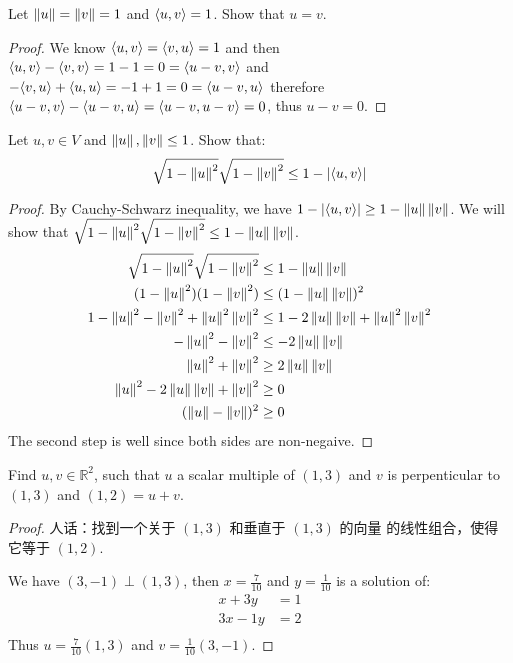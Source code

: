 \documentclass[../main.tex]{subfiles}
\begin{document}
\setcounter{exercise}{8}
\begin{exercise}
  Let $\left\Vert u \right\Vert = \left\Vert v \right\Vert = 1$ and $\langle u , v\rangle = 1$. Show that $u = v$.
\end{exercise}
\begin{proof}
  We know $\langle u , v\rangle = \langle v , u\rangle = 1$ and then
  $\langle u , v\rangle - \langle v , v\rangle = 1 - 1 = 0 = \langle u - v , v\rangle$ and
  $- \langle v , u\rangle + \langle u , u\rangle = - 1 + 1 = 0 = \langle u - v , u\rangle$ therefore 
  $\langle u - v , v\rangle - \langle u - v , u\rangle = \langle u - v , u - v\rangle = 0$,
  thus $u - v = 0$.
\end{proof}

\begin{exercise}
  Let $u, v \in V$ and $\left\Vert u \right\Vert, \left\Vert v \right\Vert \le 1$. Show that:
  \[
  \sqrt{1 - \left\Vert u \right\Vert^2}\sqrt{1 - \left\Vert v \right\Vert^2} \le 1 - |\langle u , v\rangle|
  \]
\end{exercise}
\begin{proof}
  By Cauchy-Schwarz inequality, we have $1 - |\langle u , v\rangle| \ge 1 - \left\Vert u \right\Vert\left\Vert v \right\Vert$.
  We will show that $\sqrt{1 - \left\Vert u \right\Vert^2}\sqrt{1 - \left\Vert v \right\Vert^2} \le 1 - \left\Vert u \right\Vert\left\Vert v \right\Vert$.
  \begin{align*}
    \sqrt{1 - \left\Vert u \right\Vert^2}\sqrt{1 - \left\Vert v \right\Vert^2} & \le 1 - \left\Vert u \right\Vert\left\Vert v \right\Vert \\
    (1 - \left\Vert u \right\Vert^2)(1 - \left\Vert v \right\Vert^2) & \le (1 - \left\Vert u \right\Vert\left\Vert v \right\Vert)^2 \\
    1 - \left\Vert u \right\Vert^2 - \left\Vert v \right\Vert^2 + \left\Vert u \right\Vert^2\left\Vert v \right\Vert^2 & \le 1 - 2\left\Vert u \right\Vert\left\Vert v \right\Vert + \left\Vert u \right\Vert^2\left\Vert v \right\Vert^2 \\
    - \left\Vert u \right\Vert^2 - \left\Vert v \right\Vert^2 & \le - 2\left\Vert u \right\Vert\left\Vert v \right\Vert \\
    \left\Vert u \right\Vert^2 + \left\Vert v \right\Vert^2 & \ge 2\left\Vert u \right\Vert\left\Vert v \right\Vert \\
    \left\Vert u \right\Vert^2 - 2\left\Vert u \right\Vert\left\Vert v \right\Vert + \left\Vert v \right\Vert^2 & \ge 0 \\
    (\left\Vert u \right\Vert - \left\Vert v \right\Vert)^2 & \ge 0 \\
  \end{align*}
  The second step is well since both sides are non-negaive.
\end{proof}

\begin{exercise}
  Find $u, v \in \mathbb{R}^2$, such that $u$ a scalar multiple of $(1, 3)$
  and $v$ is perpenticular to $(1, 3)$ and $(1, 2) = u + v$.
\end{exercise}
\begin{proof}
  人话：找到一个关于 $(1, 3)$ 和垂直于 $(1, 3)$ 的向量 的线性组合，使得它等于 $(1, 2)$.

  We have $(3, -1) \perp (1, 3)$, then $x = \frac{7}{10}$ and $y = \frac{1}{10}$
  is a solution of:
  \begin{align*}
    x + 3y &= 1 \\
    3x - 1y &= 2 \\
  \end{align*}
  Thus $u = \frac{7}{10}(1, 3)$ and $v = \frac{1}{10}(3, -1)$.
\end{proof}
\end{document}
